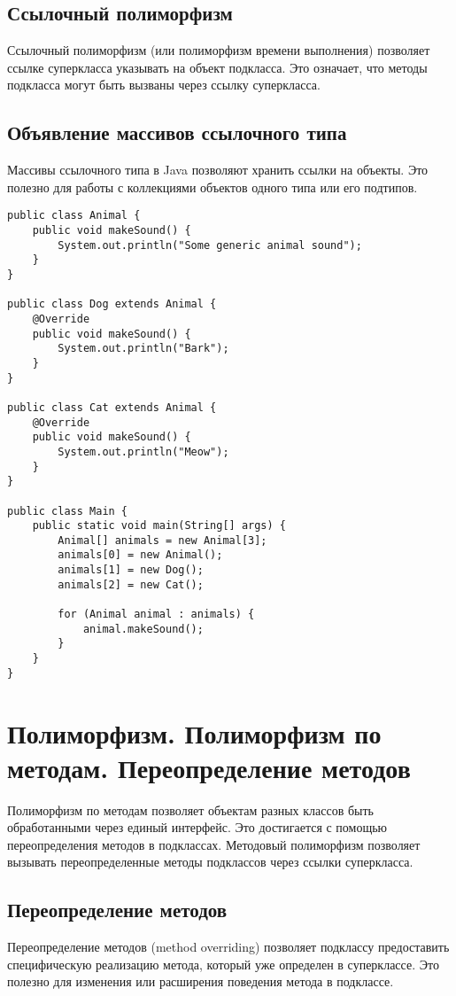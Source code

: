 \documentclass[12pt, a4paper]{article}
\begin{document}
\subsection*{Ссылочный полиморфизм}
Ссылочный полиморфизм (или полиморфизм времени выполнения) позволяет ссылке суперкласса указывать на объект подкласса. Это означает, что методы подкласса могут быть вызваны через ссылку суперкласса.

\subsection*{Объявление массивов ссылочного типа}
Массивы ссылочного типа в Java позволяют хранить ссылки на объекты. Это полезно для работы с коллекциями объектов одного типа или его подтипов.

\begin{verbatim}
public class Animal {
    public void makeSound() {
        System.out.println("Some generic animal sound");
    }
}

public class Dog extends Animal {
    @Override
    public void makeSound() {
        System.out.println("Bark");
    }
}

public class Cat extends Animal {
    @Override
    public void makeSound() {
        System.out.println("Meow");
    }
}

public class Main {
    public static void main(String[] args) {
        Animal[] animals = new Animal[3];
        animals[0] = new Animal();
        animals[1] = new Dog();
        animals[2] = new Cat();

        for (Animal animal : animals) {
            animal.makeSound();
        }
    }
}
\end{verbatim}



\section{Полиморфизм. Полиморфизм по методам. Переопределение методов}
Полиморфизм по методам позволяет объектам разных классов быть обработанными через единый интерфейс. Это достигается с помощью переопределения методов в подклассах. Методовый полиморфизм позволяет вызывать переопределенные методы подклассов через ссылки суперкласса.

\subsection*{Переопределение методов}
Переопределение методов (method overriding) позволяет подклассу предоставить специфическую реализацию метода, который уже определен в суперклассе. Это полезно для изменения или расширения поведения метода в подклассе.
\end{document}
